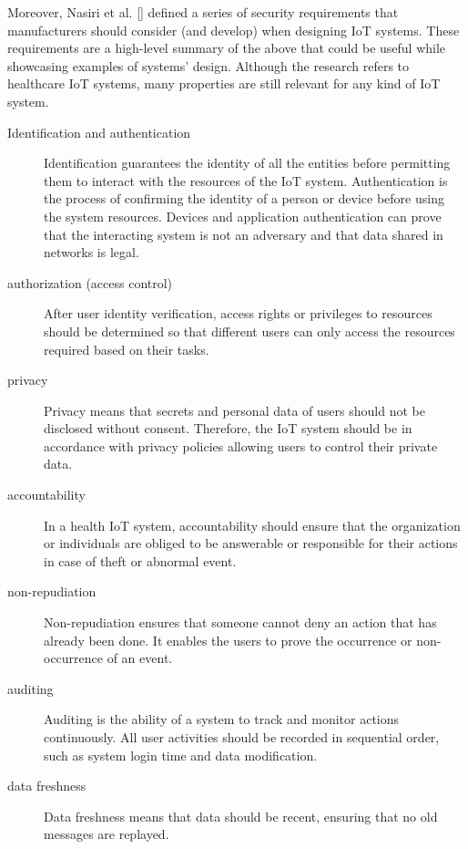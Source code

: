     
    Moreover, Nasiri et al. [] defined a series of security requirements that manufacturers should consider (and develop) when designing IoT systems. These requirements are a high-level summary of the above that could be useful while showcasing examples of systems’ design. Although the research refers to healthcare IoT systems, many properties are still relevant for any kind of IoT system.
    
    \begin{description}
        \item[Identification and authentication] Identification guarantees the identity of all the entities before permitting them to interact with the resources of the IoT system. Authentication is the process of confirming the identity of a person or device before using the system resources. Devices and application authentication can prove that the interacting system is not an adversary and that data shared in networks is legal.
        
        \item[authorization (access control)] After user identity verification, access rights or privileges to resources should be determined so that different users can only access the resources required based on their tasks.

        \item[privacy] Privacy means that secrets and personal data of users should not be disclosed without consent. Therefore, the IoT system should be in accordance with privacy policies allowing users to control their private data.

        \item[accountability] In a health IoT system, accountability should ensure that the organization or individuals are obliged to be answerable or responsible for their actions in case of theft or abnormal event.

        \item[non-repudiation] Non-repudiation ensures that someone cannot deny an action that has already been done. It enables the users to prove the occurrence or non-occurrence of an event.

        \item[auditing] Auditing is the ability of a system to track and monitor actions continuously. All user activities should be recorded in sequential order, such as system login time and data modification.
        
        \item[data freshness] Data freshness means that data should be recent, ensuring that no old messages are replayed.

        

    \end{description}
    